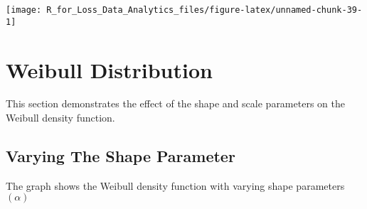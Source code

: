 \documentclass[]{book}
\theoremstyle{definition}
\theoremstyle{definition}
\theoremstyle{definition}
\theoremstyle{remark}
\begin{document}
\begin{center}\texttt{[image: R\_for\_Loss\_Data\_Analytics\_files/figure-latex/unnamed-chunk-39-1]} \end{center}

\section{Weibull Distribution}\label{weibull-distribution}

This section demonstrates the effect of the shape and scale parameters
on the Weibull density function.

\subsection{Varying The Shape
Parameter}\label{varying-the-shape-parameter-2}

The graph shows the Weibull density function with varying shape
parameters \((\alpha)\)
\end{document}
